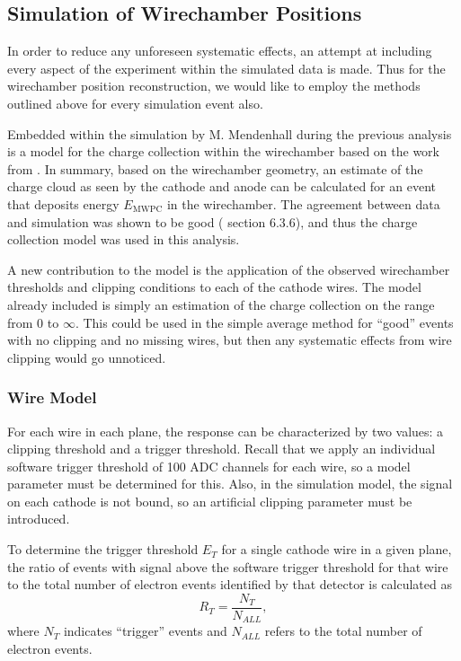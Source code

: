 \subsection{Simulation of Wirechamber Positions} \label{ssec:simWirePos}

In order to reduce any unforeseen systematic effects, an attempt at including
every aspect of the experiment within the simulated data is made. Thus for the wirechamber
position reconstruction, we would like to employ the methods outlined above for every
simulation event also. 

Embedded within the simulation by M. Mendenhall during the previous analysis
is a model for the charge collection within the wirechamber based on the work
from \cite{mathieson1991induced}. In summary, based on the wirechamber geometry, an estimate
of the charge cloud as seen by the cathode and anode can be calculated for an event
that deposits energy $E_{\mathrm{MWPC}}$ in the wirechamber. The agreement between data and simulation was
shown to be good (\cite{mpmThesis} section 6.3.6), and thus the charge collection
model was used in this analysis.

A new contribution to the model is the application of the observed wirechamber thresholds
and clipping conditions to each of the cathode wires. The model already included is simply an estimation of the charge
collection on the range from $0$ to $\infty$. This could be used in the simple average method for ``good'' events
with no clipping and no missing wires, but then any systematic effects from wire clipping would go unnoticed.

\subsubsection{Wire Model}

For each wire in each plane, the response can be characterized by two values: a clipping threshold and a trigger threshold.
Recall that we apply an individual software trigger threshold of 100 ADC channels for each wire, so a model parameter must
be determined for this. Also, in the simulation model, the signal on each cathode is not bound, so an artificial
clipping parameter must be introduced.

To determine the trigger threshold $E_T$ for a single cathode wire in a given plane, the ratio of
events with signal above the software trigger threshold for that wire
to the total number of electron events identified by that detector is calculated as
\begin{equation}
  R_{T} = \frac{N_T}{N_{ALL}},
\end{equation}
where $N_T$ indicates ``trigger'' events and $N_{ALL}$ refers to the total number of electron events.

